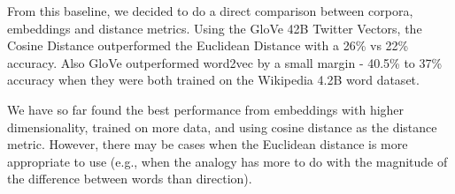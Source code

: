 \documentclass[11pt]{article}
\begin{document}




From this baseline, we decided to do a direct comparison between
corpora, embeddings and distance metrics. Using the GloVe 42B Twitter
Vectors, the Cosine Distance outperformed the Euclidean Distance with a
26\% vs 22\% accuracy. Also GloVe outperformed word2vec by a small
margin - 40.5\% to 37\% accuracy when they were both trained on the
Wikipedia 4.2B word dataset.

We have so far found the best performance from embeddings with higher
dimensionality, trained on more data, and using cosine distance as the
distance metric. However, there may be cases when the Euclidean distance
is more appropriate to use (e.g., when the analogy has more to do with
the magnitude of the difference between words than direction).
\end{document}
